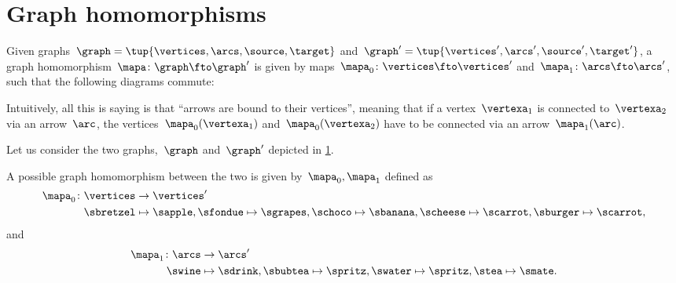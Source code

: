

\section{Graph homomorphisms}
\begin{definition}
    \label{def:graph_homom}
    Given graphs~$\graph=\tup{\vertices,\arcs,\source,\target}$ and~$\graph'=\tup{\vertices',\arcs',\source',\target'}$, a graph homomorphism~$\mapa \colon \graph \fto \graph'$ is given by maps~$\mapa_0\colon \vertices \fto \vertices'$ and~$\mapa_1\colon \arcs \fto \arcs'$, such that the following diagrams commute:
    \begin{center}
    \end{center}
\end{definition}
\begin{remark}
    Intuitively, all this is saying is that ``arrows are bound to their vertices'', meaning that if a vertex~$\vertexa_1$ is connected to~$\vertexa_2$ via an arrow~$\arc$, the vertices~$\mapa_0(\vertexa_1)$ and~$\mapa_0(\vertexa_2)$ have to be connected via an arrow~$\mapa_1(\arc)$.
\end{remark}

\begin{example}
    \label{exa:homomorphism_graph_positive}
    Let us consider the two graphs,~$\graph$ and~$\graph'$ depicted in \cref{fig:ex_graph_homom}.
    \begin{figure}[h]
        \centering
        \caption{}
        \label{fig:ex_graph_homom}
    \end{figure}
    
    A possible graph homomorphism between the two is given by~$\mapa_0,\mapa_1$ defined as
    \begin{equation*}
        \begin{aligned}
            \mapa_0\colon \vertices &\to \vertices'\\
            \sbretzel&\mapsto \sapple,
            \sfondue\mapsto \sgrapes,
            \schoco\mapsto \sbanana,
            \scheese\mapsto \scarrot,
            \sburger\mapsto \scarrot,
        \end{aligned}
    \end{equation*}
    and
    \begin{equation*}
        \begin{aligned}
            \mapa_1\colon \arcs &\to \arcs'\\
            \swine&\mapsto \sdrink,
            \sbubtea\mapsto \spritz,
            \swater\mapsto \spritz,
            \stea\mapsto \smate.
        \end{aligned}
    \end{equation*}
\end{example}

